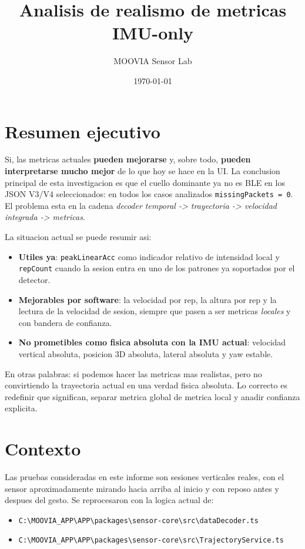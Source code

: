 \documentclass[11pt,a4paper]{article}
\title{Analisis de realismo de metricas IMU-only}
\author{MOOVIA Sensor Lab}
\date{\today}
\begin{document}
\maketitle

\section*{Resumen ejecutivo}
Si, las metricas actuales \textbf{pueden mejorarse} y, sobre todo, \textbf{pueden interpretarse mucho mejor} de lo que hoy se hace en la UI. La conclusion principal de esta investigacion es que el cuello dominante ya no es BLE en los JSON V3/V4 seleccionados: en todos los casos analizados \texttt{missingPackets = 0}. El problema esta en la cadena \emph{decoder temporal -> trayectoria -> velocidad integrada -> metricas}.

La situacion actual se puede resumir asi:
\begin{itemize}[leftmargin=14pt]
  \item \textbf{Utiles ya}: \texttt{peakLinearAcc} como indicador relativo de intensidad local y \texttt{repCount} cuando la sesion entra en uno de los patrones ya soportados por el detector.
  \item \textbf{Mejorables por software}: la velocidad por rep, la altura por rep y la lectura de la velocidad de sesion, siempre que pasen a ser metricas \emph{locales} y con bandera de confianza.
  \item \textbf{No prometibles como fisica absoluta con la IMU actual}: velocidad vertical absoluta, posicion 3D absoluta, lateral absoluta y yaw estable.
\end{itemize}

En otras palabras: si podemos hacer las metricas mas realistas, pero no convirtiendo la trayectoria actual en una verdad fisica absoluta. Lo correcto es redefinir que significan, separar metrica global de metrica local y anadir confianza explicita.

\section{Contexto}
Las pruebas consideradas en este informe son sesiones verticales reales, con el sensor aproximadamente mirando hacia arriba al inicio y con reposo antes y despues del gesto. Se reprocesaron con la logica actual de:
\begin{itemize}[leftmargin=14pt]
  \item \texttt{C:\textbackslash MOOVIA\_APP\textbackslash APP\textbackslash packages\textbackslash sensor-core\textbackslash src\textbackslash dataDecoder.ts}
  \item \texttt{C:\textbackslash MOOVIA\_APP\textbackslash APP\textbackslash packages\textbackslash sensor-core\textbackslash src\textbackslash TrajectoryService.ts}
\end{itemize}
\end{document}
